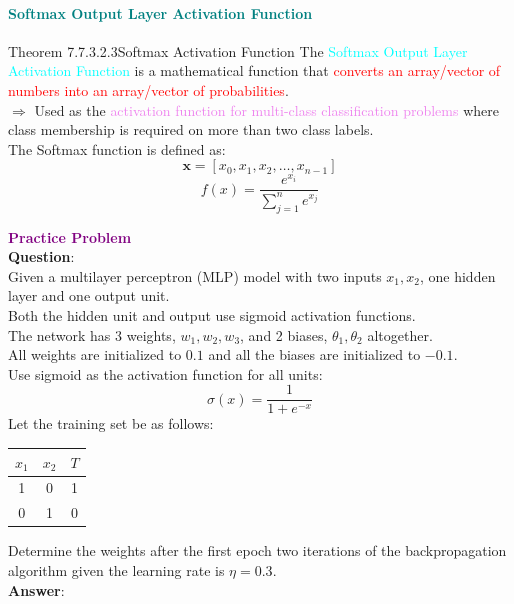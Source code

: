 \documentclass{book}
\begin{document}
\textcolor{teal}{\paragraph{Softmax Output Layer Activation Function}}
\begin{thmBox}{Theorem 7.7.3.2.3}{Softmax Activation Function}
    The \textcolor{cyan}{Softmax Output Layer Activation Function} is a mathematical function that \textcolor{red}{converts an array/vector of numbers into an array/vector of probabilities}.\\
    $\Rightarrow$ Used as the \textcolor{violet}{activation function for multi-class classification problems} where class membership is required on more than two class labels.\\
    The Softmax function is defined as:
    \[
        \textbf{x} = [x_0, x_1, x_2, \ldots, x_{n-1}]
    \]
    \[
        f(x) = \frac{e^{x_{i}}}{\sum_{j=1}^{n}e^{x_{j}}}
    \]
\end{thmBox}
\newpage
\textbf{\textcolor{purple}{\Large{Practice Problem}}}\\
\textbf{Question}:\\
Given a multilayer perceptron (MLP) model with two inputs \(x_1, x_2\), one hidden layer and one output unit.\\
Both the hidden unit and output use sigmoid activation functions.\\
The network has 3 weights, \(w_1, w_2, w_3\), and 2 biases, \(\theta_1, \theta_2\) altogether.\\
All weights are initialized to $0.1$ and all the biases are initialized to $-0.1$.\\
Use sigmoid as the activation function for all units:
\[
    \sigma(x) = \frac{1}{1+e^{-x}}
\]
Let the training set be as follows:
\begin{center}
    \begin{tabular}{|c|c|c|}
        \hline
        \rowcolor{lightblue}
        \(x_1\) & \(x_2\) & \(T\)\\
        \hline
        1 & 0 & 1 \\
        \hline
        0 & 1 & 0 \\
        \hline
    \end{tabular}
\end{center}
Determine the weights after the first epoch two iterations of the backpropagation algorithm given the learning rate is $\eta = 0.3$.\\
\vspace{2mm}
\textbf{Answer}:\\
\end{document}
